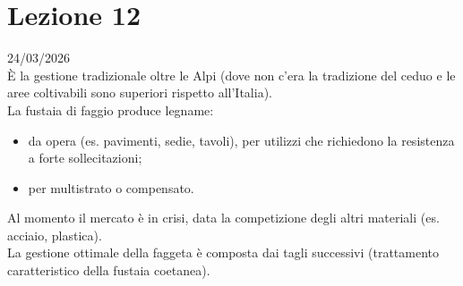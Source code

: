\section{Lezione 12} \hfill 24/03/2026\\
È la gestione tradizionale oltre le Alpi (dove non c'era la tradizione del ceduo e le aree coltivabili sono superiori rispetto all'Italia).\\
La fustaia di faggio produce legname:
\begin{itemize}[nosep]
    \item da opera (es. pavimenti, sedie, tavoli), per utilizzi che richiedono la resistenza a forte sollecitazioni;
    \item per multistrato o compensato.
\end{itemize} 
Al momento il mercato è in crisi, data la competizione degli altri materiali (es. acciaio, plastica).\\
La gestione ottimale della faggeta è composta dai tagli successivi (trattamento caratteristico della fustaia coetanea).\\
